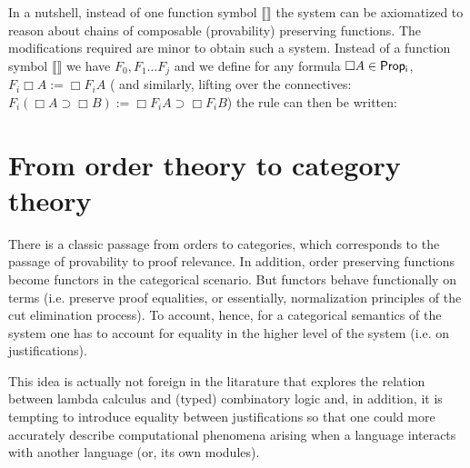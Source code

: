 In a nutshell, instead 
of one function symbol $\llbracket \rrbracket$ 
the system can 
be axiomatized to reason about chains of 
composable (provability) preserving functions. 
The modifications required are minor to obtain such a system.
Instead of a function symbol $\llbracket \rrbracket$ we have $F_0, F_1\ldots F_j$ and we 
define for any formula $\Box A\in {\sf Prop_i}$, 
$F_i\Box A:= \Box F_i A$ (
    and similarly, lifting over the connectives: 
$F_i(\Box A\supset \Box B):= \Box F_i A\supset\Box F_i B$)
the rule can then be written:





\section{From order theory to category theory}
There is a classic passage from orders to categories, 
which corresponds to the passage of provability to 
proof relevance. In addition, order preserving functions become 
functors in the categorical scenario. But functors behave functionally
on terms (i.e. preserve proof equalities, or essentially, normalization principles of the cut elimination process).
To account, hence, for 
a categorical semantics of the system one has to account for equality
in the higher level of the system (i.e. on justifications).

This idea is actually not foreign in the litarature that explores the relation
between lambda calculus and (typed) combinatory logic and, in addition,
it is tempting to introduce equality between justifications so that one
could more accurately describe computational phenomena arising when 
a language interacts with another language (or, its own modules).

